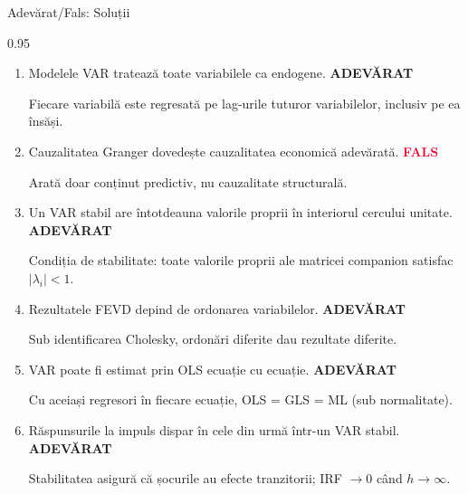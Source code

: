 \documentclass[9pt, aspectratio=169, t]{beamer}
\begin{document}
\begin{frame}{Adevărat/Fals: Soluții}
    \begin{cminipage}{0.95\textwidth}
    {\small
    \begin{enumerate}\setlength{\itemsep}{1pt}
        \item Modelele VAR tratează toate variabilele ca endogene. \hfill \textcolor{Forest}{\textbf{ADEVĂRAT}}

        {\footnotesize \textcolor{MediumGray}{Fiecare variabilă este regresată pe lag-urile tuturor variabilelor, inclusiv pe ea însăși.}}

        \item Cauzalitatea Granger dovedește cauzalitatea economică adevărată. \hfill \textcolor{Crimson}{\textbf{FALS}}

        {\footnotesize \textcolor{MediumGray}{Arată doar conținut predictiv, nu cauzalitate structurală.}}

        \item Un VAR stabil are întotdeauna valorile proprii în interiorul cercului unitate. \hfill \textcolor{Forest}{\textbf{ADEVĂRAT}}

        {\footnotesize \textcolor{MediumGray}{Condiția de stabilitate: toate valorile proprii ale matricei companion satisfac $|\lambda_i| < 1$.}}

        \item Rezultatele FEVD depind de ordonarea variabilelor. \hfill \textcolor{Forest}{\textbf{ADEVĂRAT}}

        {\footnotesize \textcolor{MediumGray}{Sub identificarea Cholesky, ordonări diferite dau rezultate diferite.}}

        \item VAR poate fi estimat prin OLS ecuație cu ecuație. \hfill \textcolor{Forest}{\textbf{ADEVĂRAT}}

        {\footnotesize \textcolor{MediumGray}{Cu aceiași regresori în fiecare ecuație, OLS = GLS = ML (sub normalitate).}}

        \item Răspunsurile la impuls dispar în cele din urmă într-un VAR stabil. \hfill \textcolor{Forest}{\textbf{ADEVĂRAT}}

        {\footnotesize \textcolor{MediumGray}{Stabilitatea asigură că șocurile au efecte tranzitorii; IRF $\to 0$ când $h \to \infty$.}}
    \end{enumerate}
    }
    \end{cminipage}
\end{frame}
\end{document}
